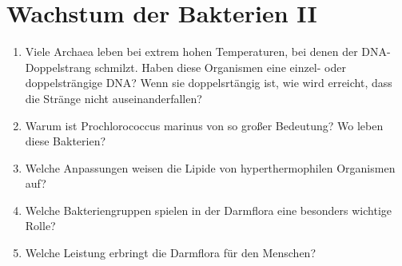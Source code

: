 
\section{Wachstum der Bakterien II}
\begin{enumerate}
	\item Viele Archaea leben bei extrem hohen Temperaturen, bei denen der DNA-Doppelstrang schmilzt. Haben diese Organismen eine einzel- oder doppelsträngige DNA? Wenn sie doppelsrtängig ist, wie wird erreicht, dass die Stränge nicht auseinanderfallen?
	\item  Warum ist Prochlorococcus marinus von so großer Bedeutung? Wo leben diese Bakterien?
	\item Welche Anpassungen weisen die Lipide von hyperthermophilen Organismen auf?
	\item Welche Bakteriengruppen spielen in der Darmflora eine besonders wichtige Rolle?
	\item Welche Leistung erbringt die Darmflora für den Menschen?
\end{enumerate}
